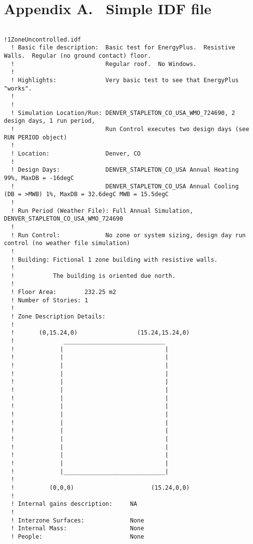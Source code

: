 \chapter{Appendix A.~ Simple IDF file}\label{appendix-a.-simple-idf-file}

\begin{lstlisting}

!1ZoneUncontrolled.idf
  ! Basic file description:  Basic test for EnergyPlus.  Resistive Walls.  Regular (no ground contact) floor.
  !                          Regular roof.  No Windows.
  !
  ! Highlights:              Very basic test to see that EnergyPlus "works".
  !
  !
  ! Simulation Location/Run: DENVER_STAPLETON_CO_USA_WMO_724690, 2 design days, 1 run period,
  !                          Run Control executes two design days (see RUN PERIOD object)
  !
  ! Location:                Denver, CO
  !
  ! Design Days:             DENVER_STAPLETON_CO_USA Annual Heating 99%, MaxDB = -16degC
  !                          DENVER_STAPLETON_CO_USA Annual Cooling (DB = >MWB) 1%, MaxDB = 32.6degC MWB = 15.5degC
  !
  ! Run Period (Weather File): Full Annual Simulation, DENVER_STAPLETON_CO_USA_WMO_724690
  !
  ! Run Control:             No zone or system sizing, design day run control (no weather file simulation)
  !
  ! Building: Fictional 1 zone building with resistive walls.
  !
  !           The building is oriented due north.
  !
  ! Floor Area:        232.25 m2
  ! Number of Stories: 1
  !
  ! Zone Description Details:
  !
  !       (0,15.24,0)                 (15.24,15.24,0)
  !              _____________________________
  !             |                             |
  !             |                             |
  !             |                             |
  !             |                             |
  !             |                             |
  !             |                             |
  !             |                             |
  !             |                             |
  !             |                             |
  !             |                             |
  !             |                             |
  !             |                             |
  !             |                             |
  !             |                             |
  !             |                             |
  !             |_____________________________|
  !
  !          (0,0,0)                      (15.24,0,0)
  !
  ! Internal gains description:     NA
  !
  ! Interzone Surfaces:             None
  ! Internal Mass:                  None
  ! People:                         None

\end{lstlisting}
